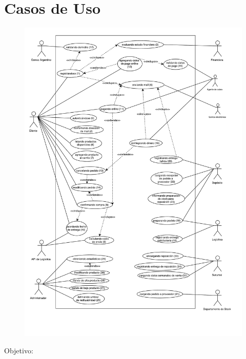 \section{Casos de Uso}

\begin{figure}[H]
  \begin{center}
  \includegraphics[width=500px]{tp2/images/casos-de-uso.pdf}
  \end{center}
\end{figure}

\captionsetup[table]{name=Caso de uso}

Objetivo:   

